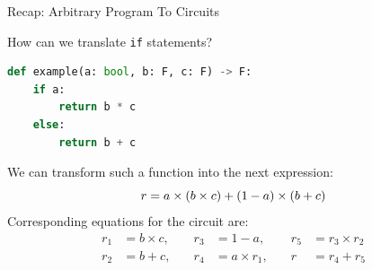 \documentclass{zkdl-presentation-template}
\begin{document}
    \begin{frame}[fragile]{Recap: Arbitrary Program To Circuits}
        \begin{example}
            How can we translate \texttt{if} statements?
            \begin{lstlisting}[language=Python,numbers=none]
def example(a: bool, b: F, c: F) -> F:
    if a:
        return b * c
    else:
        return b + c
            \end{lstlisting}
            \pause
            We can transform such a function into the next expression:
            \vspace{-8pt}
            \begin{equation*}
                r = a \times (b \times c) + (1 - a) \times (b + c)
                \vspace{-8pt}
            \end{equation*}
            \pause
            Corresponding equations for the circuit are:
            \vspace{-8pt}
            \begin{equation*}
                \begin{aligned}
                    r_1 &= b \times c, \quad &r_3 &= 1 - a, \quad &r_5 &= r_3 \times r_2 \\
                    r_2 &= b + c, \quad &r_4 &= a \times r_1, \quad &r &= r_4 + r_5
                \end{aligned}
            \end{equation*}
        \end{example}
    \end{frame}
\end{document}
